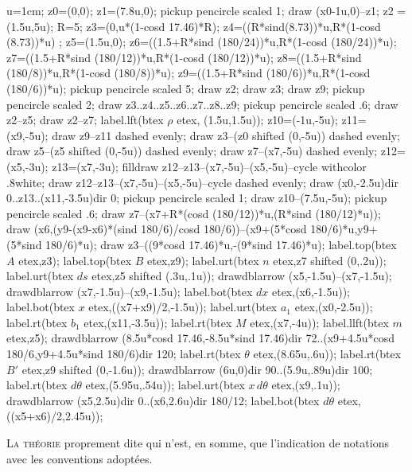 \documentclass[12pt,a4paper,twocolumn]{book} %
\begin{document}
\begin{mpdisplay}
  u=1cm;
  z0=(0,0);
  z1=(7.8u,0);
  pickup pencircle scaled 1;
  draw (x0-1u,0)--z1;
  z2 = (1.5u,5u);
  R=5;
  z3=(0,u*(1-cosd 17.46)*R);
  z4=((R*sind(8.73))*u,R*(1-cosd (8.73))*u) ;
  z5=(1.5u,0);
  z6=((1.5+R*sind (180/24))*u,R*(1-cosd (180/24))*u);
  z7=((1.5+R*sind (180/12))*u,R*(1-cosd (180/12))*u);
  z8=((1.5+R*sind (180/8))*u,R*(1-cosd (180/8))*u);
  z9=((1.5+R*sind (180/6))*u,R*(1-cosd (180/6))*u);
  pickup pencircle scaled 5;
  draw z2;
  draw z3;
  draw z9;
  pickup pencircle scaled 2;
  draw z3..z4..z5..z6..z7..z8..z9;
  pickup pencircle scaled .6;
  draw z2--z5;
  draw z2--z7;
  label.lft(btex $\rho$ etex, (1.5u,1.5u));
  z10=(-1u,-5u);
  z11=(x9,-5u);
  draw z9--z11 dashed evenly;
  draw z3--(z0 shifted (0,-5u)) dashed evenly;
  draw z5--(z5 shifted (0,-5u)) dashed evenly;
  draw z7--(x7,-5u) dashed evenly;
  z12=(x5,-3u);
  z13=(x7,-3u);
  filldraw z12--z13--(x7,-5u)--(x5,-5u)--cycle withcolor .8white;
  draw z12--z13--(x7,-5u)--(x5,-5u)--cycle dashed evenly;
  draw (x0,-2.5u){dir 0}..z13..(x11,-3.5u){dir 0};
  pickup pencircle scaled 1;
  draw z10--(7.5u,-5u);
  pickup pencircle scaled .6;
  draw z7--(x7+R*(cosd (180/12))*u,(R*sind (180/12)*u));
  draw (x6,(y9-(x9-x6)*(sind 180/6)/cosd 180/6))--(x9+(5*cosd 180/6)*u,y9+(5*sind 180/6)*u);
  draw z3--((9*cosd 17.46)*u,-(9*sind 17.46)*u);
  label.top(btex $A$ etex,z3);
  label.top(btex $B$ etex,z9);
  label.urt(btex $n$ etex,z7 shifted (0,.2u));
  label.urt(btex $ds$ etex,z5 shifted (.3u,.1u));
  drawdblarrow (x5,-1.5u)--(x7,-1.5u);
  drawdblarrow (x7,-1.5u)--(x9,-1.5u);
  label.bot(btex $dx$ etex,(x6,-1.5u));
  label.bot(btex $x$ etex,((x7+x9)/2,-1.5u));
  label.urt(btex $a_1$ etex,(x0,-2.5u));
  label.rt(btex $b_1$ etex,(x11,-3.5u));
  label.rt(btex $M$ etex,(x7,-4u));
  label.llft(btex $m$ etex,z5);
  drawdblarrow (8.5u*cosd 17.46,-8.5u*sind 17.46){dir 72}..(x9+4.5u*cosd 180/6,y9+4.5u*sind 180/6){dir 120};
  label.rt(btex $\theta$ etex,(8.65u,.6u));
  label.rt(btex $B'$ etex,z9 shifted (0,-1.6u));
  drawdblarrow (6u,0){dir 90}..(5.9u,.89u){dir 100};
  label.rt(btex $d\theta$ etex,(5.95u,.54u));
  label.urt(btex $x\,d\theta$ etex,(x9,.1u));
  drawdblarrow (x5,2.5u){dir 0}..(x6,2.6u){dir 180/12};
  label.bot(btex $d\theta$ etex,((x5+x6)/2,2.45u));
\end{mpdisplay}



\lettrine{L}{a théorie} proprement dite qui n'est, en somme, que l'indication
de notations avec les conventions adoptées.
\end{document}
